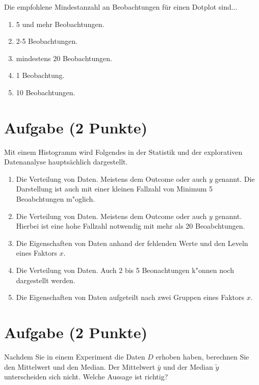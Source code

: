 \documentclass[a4paper, 10pt]{scrartcl}\usepackage[]{graphicx}\usepackage[]{xcolor}
\begin{document}
Die empfohlene Mindestanzahl an Beobachtungen f{\"u}r einen Dotplot sind...



\begin{enumerate}
\item [\textbf{A} \msquare] 5 und mehr Beobachtungen.
\item [\textbf{B} \msquare] 2-5 Beobachtungen.
\item [\textbf{C} \msquare] mindestens 20 Beobachtungen.
\item [\textbf{D} \msquare] 1 Beobachtung.
\item [\textbf{E} \msquare] 10 Beobachtungen.
\end{enumerate} 

\section{Aufgabe \hfill (2 Punkte)}



Mit einem Histogramm wird Folgendes in der Statistik und der explorativen Datenanalyse haupts{\"a}chlich dargestellt.



\begin{enumerate}
\item [\textbf{A} \msquare] Die Verteilung von Daten. Meistens dem Outcome oder auch $y$ genannt. Die Darstellung ist auch mit einer kleinen Fallzahl von Minimum 5 Beoabchtungen m{"o}glich.
\item [\textbf{B} \msquare] Die Verteilung von Daten. Meistens dem Outcome oder auch $y$ genannt. Hierbei ist eine hohe Fallzahl notwendig mit mehr als 20 Beoabchtungen.
\item [\textbf{C} \msquare] Die Eigenschaften von Daten anhand der fehlenden Werte und den Leveln eines Faktors $x$.
\item [\textbf{D} \msquare] Die Verteilung von Daten. Auch 2 bis 5 Beonachtungen k{"o}nnen noch dargestellt werden.
\item [\textbf{E} \msquare] Die Eigenschaften von Daten aufgeteilt nach zwei Gruppen eines Faktors $x$.
\end{enumerate} 

\section{Aufgabe \hfill (2 Punkte)}



Nachdem Sie in einem Experiment die Daten $D$ erhoben haben, berechnen Sie den
Mittelwert und den Median. Der Mittelwert $\bar{y}$ und der Median
$\tilde{y}$ unterscheiden sich nicht. Welche Aussage ist richtig?
\end{document}

